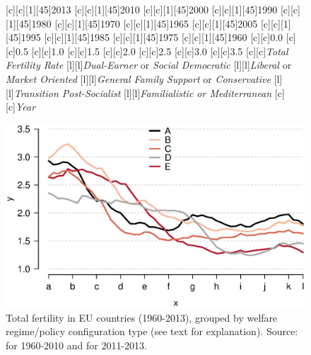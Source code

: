 \documentclass[11 pt, a4paper]{report}
\begin{document}
\begin{figure}[hbtp!]
[c][c][1][45]{\scriptsize{2013}}
[c][c][1][45]{\scriptsize{2010}}
[c][c][1][45]{\scriptsize{2000}}
[c][c][1][45]{\scriptsize{1990}}
[c][c][1][45]{\scriptsize{1980}}
[c][c][1][45]{\scriptsize{1970}}
[c][c][1][45]{\scriptsize{1965}}
[c][c][1][45]{\scriptsize{2005}}
[c][c][1][45]{\scriptsize{1995}}
[c][c][1][45]{\scriptsize{1985}}
[c][c][1][45]{\scriptsize{1975}}
[c][c][1][45]{\scriptsize{1960}}
[c][c]{\small{0.0}}
[c][c]{\small{0.5}}
[c][c]{\small{1.0}}
[c][c]{\small{1.5}}
[c][c]{\small{2.0}}
[c][c]{\small{2.5}}
[c][c]{\small{3.0}}
[c][c]{\small{3.5}}
[c][c]{\small{\emph{Total Fertility Rate}}}
[l][l]{\emph{Dual-Earner} or \emph{Social Democratic}}
[l][l]{\emph{Liberal} or \emph{Market Oriented}}
[l][l]{\emph{General Family Support} or \emph{Conservative}}
[l][l]{\emph{Transition Post-Socialist}}
[l][l]{\emph{Familialistic or Mediterranean}}
[c][c]{\emph{Year}}

\includegraphics[width=\textwidth]{../figures/Fig1.3.eps}
\caption{Total fertility in EU countries (1960-2013), grouped by welfare regime/policy configuration type (see text for explanation). Source: \cite{INED2016} for 1960-2010 and \cite{EUST2016} for 2011-2013.}
\label{Fig:03.1}
\end{figure}
\end{document}
